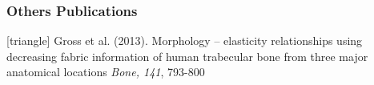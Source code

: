 \documentclass[xcolor=table]{beamer}
\begin{document}
\begin{frame}
	\frametitle{Others Publications}
	\footnotesize{
		\begin{thebibliography}{99}
			[triangle]
			 Gross et al. (2013).
			\newblock Morphology – elasticity relationships using decreasing fabric information of human trabecular bone from three major anatomical locations
			\newblock \textit{Bone, 141}, 793-800
			
		\end{thebibliography}
	}
\end{frame}

\end{document}
